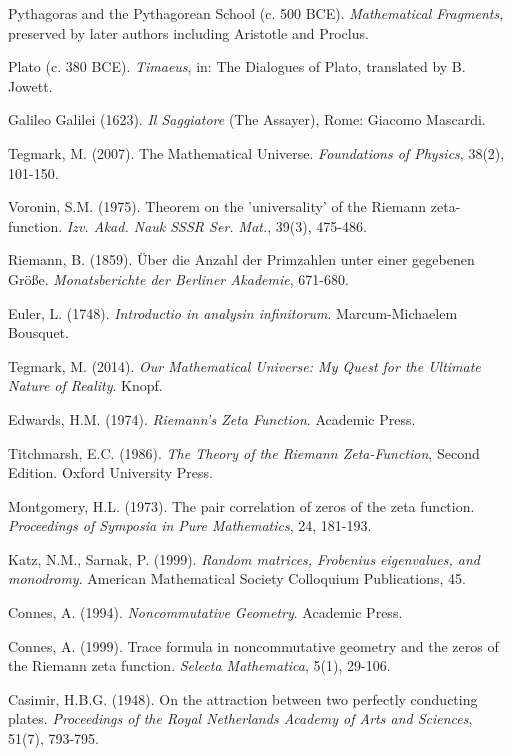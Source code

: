 \documentclass[12pt]{article}
\theoremstyle{plain}
\theoremstyle{definition}
\begin{document}
\begin{thebibliography}{99}

 Pythagoras and the Pythagorean School (c. 500 BCE). \emph{Mathematical Fragments}, preserved by later authors including Aristotle and Proclus.

 Plato (c. 380 BCE). \emph{Timaeus}, in: The Dialogues of Plato, translated by B. Jowett.

 Galileo Galilei (1623). \emph{Il Saggiatore} (The Assayer), Rome: Giacomo Mascardi.

 Tegmark, M. (2007). The Mathematical Universe. \emph{Foundations of Physics}, 38(2), 101-150.

 Voronin, S.M. (1975). Theorem on the 'universality' of the Riemann zeta-function. \emph{Izv. Akad. Nauk SSSR Ser. Mat.}, 39(3), 475-486.

 Riemann, B. (1859). Über die Anzahl der Primzahlen unter einer gegebenen Größe. \emph{Monatsberichte der Berliner Akademie}, 671-680.

 Euler, L. (1748). \emph{Introductio in analysin infinitorum}. Marcum-Michaelem Bousquet.

 Tegmark, M. (2014). \emph{Our Mathematical Universe: My Quest for the Ultimate Nature of Reality}. Knopf.

 Edwards, H.M. (1974). \emph{Riemann's Zeta Function}. Academic Press.

 Titchmarsh, E.C. (1986). \emph{The Theory of the Riemann Zeta-Function}, Second Edition. Oxford University Press.

 Montgomery, H.L. (1973). The pair correlation of zeros of the zeta function. \emph{Proceedings of Symposia in Pure Mathematics}, 24, 181-193.

 Katz, N.M., Sarnak, P. (1999). \emph{Random matrices, Frobenius eigenvalues, and monodromy}. American Mathematical Society Colloquium Publications, 45.

 Connes, A. (1994). \emph{Noncommutative Geometry}. Academic Press.

 Connes, A. (1999). Trace formula in noncommutative geometry and the zeros of the Riemann zeta function. \emph{Selecta Mathematica}, 5(1), 29-106.

 Casimir, H.B.G. (1948). On the attraction between two perfectly conducting plates. \emph{Proceedings of the Royal Netherlands Academy of Arts and Sciences}, 51(7), 793-795.


\end{thebibliography}
\end{document}
